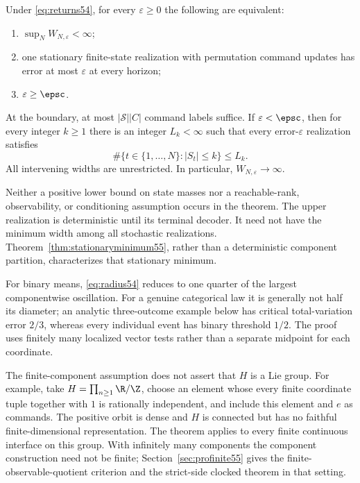 \begin{theorem}\label{thm:radius54}
Under \eqref{eq:returns54}, for every $\varepsilon\ge0$ the following are equivalent:
\begin{enumerate}
\item $\sup_N W_{N,\varepsilon}<\infty$;
\item one stationary finite-state realization with permutation command updates has error at most $\varepsilon$ at every horizon;
\item $\varepsilon\ge\epsc$.
\end{enumerate}
At the boundary, at most $|\mathcal S||C|$ command labels suffice. If $\varepsilon<\epsc$, then for every integer $k\ge1$ there is an integer $L_k<\infty$ such that every error-$\varepsilon$ realization satisfies
\begin{equation}\label{eq:occupation54}
 \#\{t\in\{1,\ldots,N\}:|S_t|\le k\}\le L_k.
\end{equation}
All intervening widths are unrestricted. In particular, $W_{N,\varepsilon}\to\infty$.
\end{theorem}
Neither a positive lower bound on state masses nor a reachable-rank, observability, or conditioning assumption occurs in the theorem. The upper realization is deterministic until its terminal decoder. It need not have the minimum width among all stochastic realizations. Theorem~\ref{thm:stationaryminimum55}, rather than a deterministic component partition, characterizes that stationary minimum.

For binary means, \eqref{eq:radius54} reduces to one quarter of the largest componentwise oscillation. For a genuine categorical law it is generally not half its diameter; an analytic three-outcome example below has critical total-variation error $2/3$, whereas every individual event has binary threshold $1/2$. The proof uses finitely many localized vector tests rather than a separate midpoint for each coordinate.

The finite-component assumption does not assert that $H$ is a Lie group. For example, take $H=\prod_{n\ge1}\R/\Z$, choose an element whose every finite coordinate tuple together with $1$ is rationally independent, and include this element and $e$ as commands. The positive orbit is dense and $H$ is connected but has no faithful finite-dimensional representation. The theorem applies to every finite continuous interface on this group. With infinitely many components the component construction need not be finite; Section~\ref{sec:profinite55} gives the finite-observable-quotient criterion and the strict-side clocked theorem in that setting.

